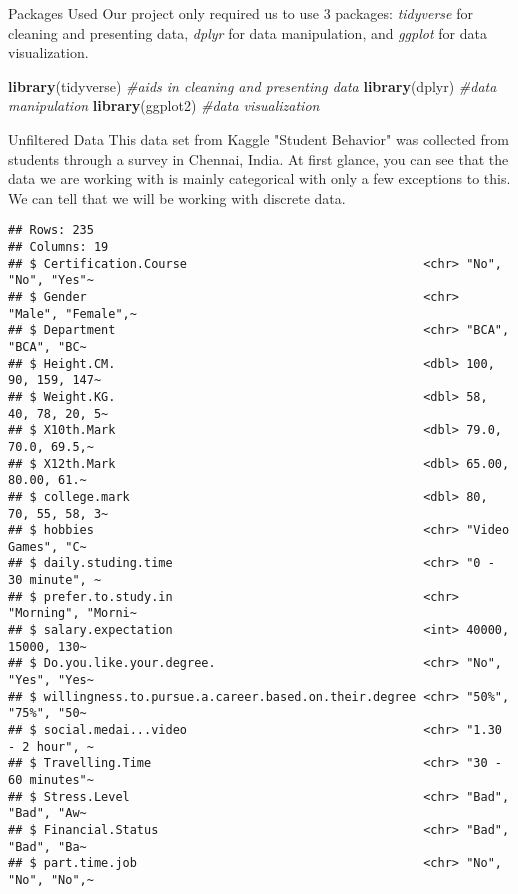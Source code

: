 \documentclass[
  ignorenonframetext,
]{beamer}
\newenvironment{Shaded}{\begin{snugshade}}{\end{snugshade}}
\newcommand{\CommentTok}[1]{\textcolor[rgb]{0.56,0.35,0.01}{\textit{#1}}}
\newcommand{\FunctionTok}[1]{\textcolor[rgb]{0.13,0.29,0.53}{\textbf{#1}}}
\newcommand{\NormalTok}[1]{#1}
\begin{document}
\begin{frame}[fragile]{Packages Used}
\protect\hypertarget{packages-used}{}
Our project only required us to use 3 packages: \emph{tidyverse} for
cleaning and presenting data, \emph{dplyr} for data manipulation, and
\emph{ggplot} for data visualization.

\begin{Shaded}
\begin{Highlighting}[]
\FunctionTok{library}\NormalTok{(tidyverse) }\CommentTok{\#aids in cleaning and presenting data}
\FunctionTok{library}\NormalTok{(dplyr) }\CommentTok{\#data manipulation}
\FunctionTok{library}\NormalTok{(ggplot2) }\CommentTok{\#data visualization}
\end{Highlighting}
\end{Shaded}
\end{frame}

\begin{frame}[fragile]{Unfiltered Data}
\protect\hypertarget{unfiltered-data}{}
This data set from Kaggle "Student Behavior" was collected from students
through a survey in Chennai, India. At first glance, you can see that
the data we are working with is mainly categorical with only a few
exceptions to this. We can tell that we will be working with discrete
data.~

\begin{verbatim}
## Rows: 235
## Columns: 19
## $ Certification.Course                                 <chr> "No", "No", "Yes"~
## $ Gender                                               <chr> "Male", "Female",~
## $ Department                                           <chr> "BCA", "BCA", "BC~
## $ Height.CM.                                           <dbl> 100, 90, 159, 147~
## $ Weight.KG.                                           <dbl> 58, 40, 78, 20, 5~
## $ X10th.Mark                                           <dbl> 79.0, 70.0, 69.5,~
## $ X12th.Mark                                           <dbl> 65.00, 80.00, 61.~
## $ college.mark                                         <dbl> 80, 70, 55, 58, 3~
## $ hobbies                                              <chr> "Video Games", "C~
## $ daily.studing.time                                   <chr> "0 - 30 minute", ~
## $ prefer.to.study.in                                   <chr> "Morning", "Morni~
## $ salary.expectation                                   <int> 40000, 15000, 130~
## $ Do.you.like.your.degree.                             <chr> "No", "Yes", "Yes~
## $ willingness.to.pursue.a.career.based.on.their.degree <chr> "50%", "75%", "50~
## $ social.medai...video                                 <chr> "1.30 - 2 hour", ~
## $ Travelling.Time                                      <chr> "30 - 60 minutes"~
## $ Stress.Level                                         <chr> "Bad", "Bad", "Aw~
## $ Financial.Status                                     <chr> "Bad", "Bad", "Ba~
## $ part.time.job                                        <chr> "No", "No", "No",~
\end{verbatim}
\end{frame}
\end{document}
